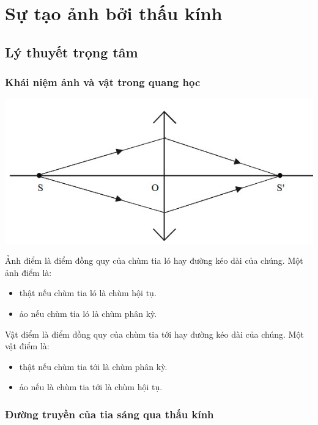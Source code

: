 \chapter{Sự tạo ảnh bởi thấu kính}


\section{Lý thuyết trọng tâm}

\subsection{Khái niệm ảnh và vật trong quang học}
\begin{center}
	\includegraphics[scale=0.7]{../figs/VN11-PH-38-L-026-2-h1.jpg}
\end{center}

Ảnh điểm là điểm đồng quy của chùm tia ló hay đường kéo dài của chúng.
Một ảnh điểm là:
\begin{itemize}
	\item thật nếu chùm tia ló là chùm hội tụ.
	\item ảo nếu chùm tia ló là chùm phân kỳ.
	\end{itemize}

Vật điểm là điểm đồng quy của chùm tia tới hay đường kéo dài của chúng.
Một vật điểm là:
\begin{itemize}
	\item thật nếu chùm tia tới là chùm phân kỳ.
	\item ảo nếu là chùm tia tới là chùm hội tụ. 
\end{itemize}
\subsection{ Đường truyền của tia sáng qua thấu  kính}
